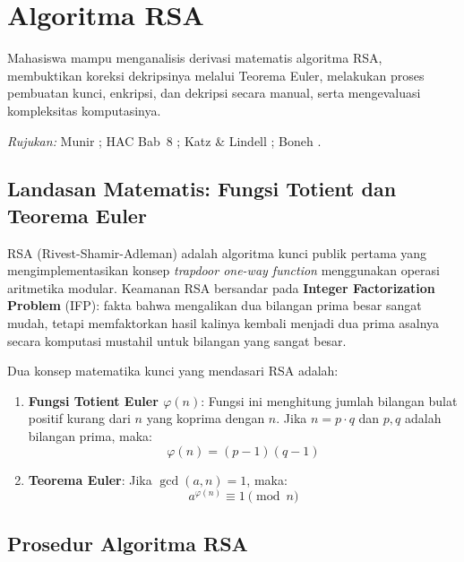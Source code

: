 \section{Algoritma RSA}

\begin{subcpmk}
  \item Mahasiswa mampu menganalisis derivasi matematis algoritma RSA, membuktikan koreksi dekripsinya melalui Teorema Euler, melakukan proses pembuatan kunci, enkripsi, dan dekripsi secara manual, serta mengevaluasi kompleksitas komputasinya.
\end{subcpmk}

\noindent\textit{Rujukan:} Munir \cite{munir2019,munir_slides_itb}; HAC Bab~8 \cite{hac_online}; Katz \& Lindell \cite{katz2020}; Boneh \cite{boneh_cs255}.

\subsection{Landasan Matematis: Fungsi Totient dan Teorema Euler}

RSA (Rivest-Shamir-Adleman) adalah algoritma kunci publik pertama yang mengimplementasikan konsep \textit{trapdoor one-way function} menggunakan operasi aritmetika modular. Keamanan RSA bersandar pada \textbf{Integer Factorization Problem} (IFP): fakta bahwa mengalikan dua bilangan prima besar sangat mudah, tetapi memfaktorkan hasil kalinya kembali menjadi dua prima asalnya secara komputasi mustahil untuk bilangan yang sangat besar.

Dua konsep matematika kunci yang mendasari RSA adalah:

\begin{enumerate}
    \item \textbf{Fungsi Totient Euler $\varphi(n)$}: Fungsi ini menghitung jumlah bilangan bulat positif kurang dari $n$ yang koprima dengan $n$. Jika $n = p \cdot q$ dan $p, q$ adalah bilangan prima, maka:
    \begin{equation}
      \varphi(n) = (p-1)(q-1)
    \end{equation}

    \item \textbf{Teorema Euler}: Jika $\gcd(a, n) = 1$, maka:
    \begin{equation}
      a^{\varphi(n)} \equiv 1 \pmod{n}
    \end{equation}
\end{enumerate}

\subsection{Prosedur Algoritma RSA}

